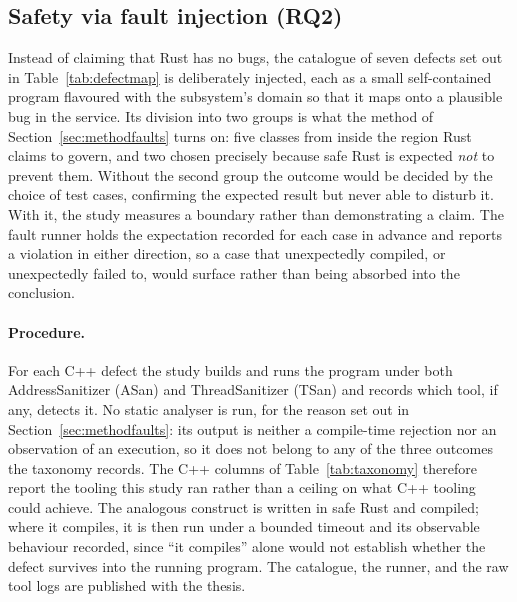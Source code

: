 \documentclass[english,twoside,openright,a4paper,censored,csm,software-track-2020]{HYthesisML}
\begin{document}
\subsection{Safety via fault injection (RQ2)}\label{sec:safetyresults}
Instead of claiming that Rust has no bugs, the catalogue of seven defects set out in
Table~\ref{tab:defectmap} is deliberately injected, each as a small self-contained program
flavoured with the subsystem's domain so that it maps onto a plausible bug in the service. Its
division into two groups is what the method of Section~\ref{sec:methodfaults} turns on: five
classes from inside the region Rust claims to govern, and two chosen precisely because safe
Rust is expected \emph{not} to prevent them. Without the second group the outcome would be
decided by the choice of test cases, confirming the expected result but never able to disturb
it. With it, the study measures a boundary rather than demonstrating a claim. The fault runner
holds the expectation recorded for each case in advance and reports a violation in either
direction, so a case that unexpectedly compiled, or unexpectedly failed to, would surface
rather than being absorbed into the conclusion.

\paragraph{Procedure.}
For each C++ defect the study builds and runs the program under both AddressSanitizer (ASan)
and ThreadSanitizer (TSan) and records which tool, if any, detects it. No static analyser is
run, for the reason set out in Section~\ref{sec:methodfaults}: its output is neither a
compile-time rejection nor an observation of an execution, so it does not belong to any of the
three outcomes the taxonomy records. The C++ columns of Table~\ref{tab:taxonomy} therefore
report the tooling this study ran rather than a ceiling on what C++ tooling could achieve. The
analogous construct is written in safe Rust and compiled; where it compiles, it is then run
under a bounded timeout and its observable behaviour recorded, since ``it compiles'' alone would
not establish whether the defect survives into the running program. The catalogue, the runner,
and the raw tool logs are published with the thesis.
\end{document}
